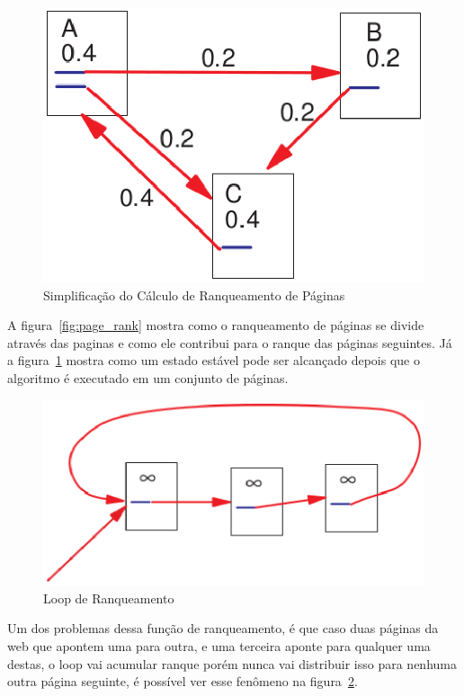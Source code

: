 \begin{figure}[h]
    \centering
        \includegraphics[keepaspectratio=true,scale=0.5]{figuras/page_rank2.eps}
    \caption{Simplificação do Cálculo de Ranqueamento de Páginas}
    \label{fig:page_rank2}
\end{figure}

A figura~\ref{fig:page_rank} mostra como o ranqueamento de páginas se divide através
das paginas e como ele contribui para o ranque das páginas seguintes. Já a 
figura~\ref{fig:page_rank2} mostra como um estado estável pode ser alcançado
depois que o algoritmo é executado em um conjunto de páginas. 

\begin{figure}[h]
    \centering
        \includegraphics[keepaspectratio=true,scale=0.5]{figuras/page_rank3.eps}
    \caption{Loop de Ranqueamento}
    \label{fig:page_rank3}
\end{figure}

Um dos problemas dessa função de ranqueamento, é que caso duas páginas da web que apontem uma para
outra, e uma terceira aponte para qualquer uma destas, o loop vai acumular ranque
porém nunca vai distribuir isso para nenhuma outra página seguinte, é possível
ver esse fenômeno na figura~\ref{fig:page_rank3}.

